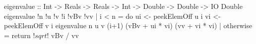 eigenvalue :: Int -> Reals -> Reals -> Int -> Double -> Double -> IO Double
eigenvalue !n !u !v !i !vBv !vv
    | i < n     = do	ui <- peekElemOff u i
			vi <- peekElemOff v i
			eigenvalue n u v (i+1) (vBv + ui * vi) (vv + vi * vi)
    | otherwise = return $! sqrt $! vBv / vv

